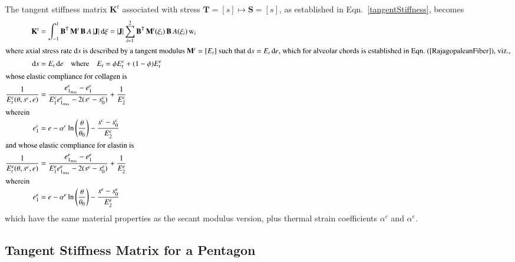 The tangent stiffness matrix $\mathbf{K}^t$ associated with stress $\mathbf{T} = [s] \mapsto \mathbf{S} = [s]$, as established in Eqn.~\eqref{tangentStiffness}, becomes
\begin{subequations}
    \begin{align}
    \mathbf{K}^t & = \int_{-1}^{1} \mathbf{B}^{\mathsf{T}} \,  \mathbf{M}^t \, \mathbf{B} \, A \, |\mathbf{J}| \, \mathrm{d} \xi
    = |\mathbf{J}| \sum_{i=1}^{2}  \mathbf{B}^{\mathsf{T}} \, \mathbf{M}^t (\xi_i) \, \mathbf{B} \, A (\xi_i) \, \mathrm{w}_i \\
    \intertext{where axial stress rate $\mathrm{d} s$ is described by a tangent modulus $\mathbf{M}^{t} = [ E_t ]$ such that $\mathrm{d} s = E_t \, \mathrm{d} e$, which for alveolar chords is established in Eqn.~(\ref{RajagopaleanFiber}), viz.,}
    \mathrm{d} s & = E_t \, \mathrm{d} e 
    \quad \text{where} \quad
    E_t = \phi E^c_t + (1-\phi) E^e_t  \\
    \intertext{whose elastic compliance for collagen is}
    \frac{1}{E^c_t (\theta , s^c , e)} & = \frac{e^c_{1_{\max}} - e_1^c}
    {E^c_1 e^c_{1_{\max}} - 2 (s^c - s^c_0)} + \frac{1}{E^c_2} \\
    \intertext{wherein} 
    e^c_1 & = e - \alpha^c \ln \left( \frac{\theta}{\theta_0} \right) - 
    \frac{s^c - s^c_0}{E^c_2} \\
    \intertext{and whose elastic compliance for elastin is}
    \frac{1}{E^e_t (\theta , s^e , e)} & = \frac{e^e_{1_{\max}} - e_1^e}
    {E^e_1 e^e_{1_{\max}} - 2 (s^e - s^e_0)} + \frac{1}{E^e_2} \\
    \intertext{wherein} 
    e^e_1 & = e - \alpha^e \ln \left( \frac{\theta}{\theta_0} \right) - 
    \frac{s^e - s^e_0}{E^e_2}
    \end{align}
\end{subequations} 
which have the same material properties as the secant modulus version, plus thermal strain coefficients $\alpha^c$ and $\alpha^e$.

\subsection{Tangent Stiffness Matrix for a Pentagon}

